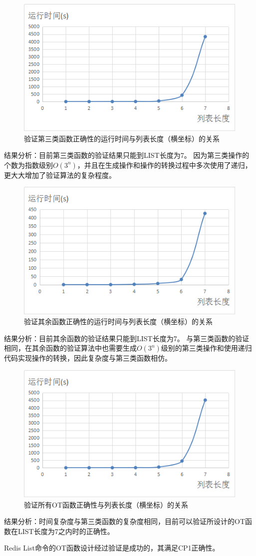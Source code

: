 \begin{figure}[H]
\centering
\includegraphics{figures/runtime3.bmp}
\caption{验证第三类函数正确性的运行时间与列表长度（横坐标）的关系}
\end{figure}
\par 结果分析：目前第三类函数的验证结果只能到LIST长度为7。
因为第三类操作的个数为指数级别$O(3^n)$，并且在生成操作和操作的转换过程中多次使用了递归，更大大增加了验证算法的复杂程度。

\begin{figure}[H]
\centering
\includegraphics{figures/runtime4.bmp}
\caption{验证其余函数正确性的运行时间与列表长度（横坐标）的关系}
\end{figure}
\par 结果分析：目前其余函数的验证结果只能到LIST长度为7。
与第三类函数的验证相同，在其余函数的验证算法中也需要生成$O(3^n)$级别的第三类操作和使用递归代码实现操作的转换，因此复杂度与第三类函数相仿。

\begin{figure}[H]
\centering
\includegraphics{figures/runtimeall.bmp}
\caption{验证所有OT函数正确性与列表长度（横坐标）的关系}
\end{figure}
\par 结果分析：时间复杂度与第三类函数的复杂度相同，目前可以验证所设计的OT函数在LIST长度为7之内时的正确性。


Redis List命令的OT函数设计经过验证是成功的，其满足CP1正确性。